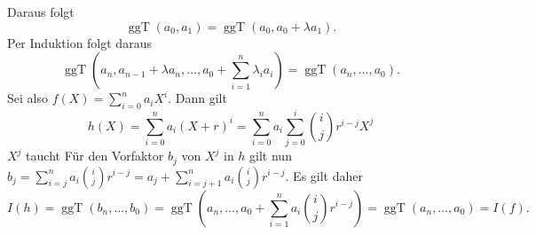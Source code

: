 \documentclass{article}
\newcommand{\ggT}{\operatorname{ggT}}
\begin{document}
\begin{enumerate}[(a)]
\[        \]
        Daraus folgt
        \[
            \ggT(a_0, a_1) = \ggT(a_0, a_0 + \lambda a_1).
        \]
        Per Induktion folgt daraus
        \[
            \ggT(a_n, a_{n-1} + \lambda a_n, \dots, a_0 + \sum_{i = 1}^{n} \lambda_i a_i) = \ggT(a_n, \dots, a_0). 
        \]
        Sei also $f(X) = \sum_{i = 0}^{n} a_i X^i$. Dann gilt 
        \[
            h(X) = \sum_{i = 0}^{n} a_i (X + r)^i = \sum_{i = 0}^{n} a_i \sum_{j = 0}^{i} \binom{i}{j} r^{i-j} X^j
        \]
        $X^j$ taucht 
        Für den Vorfaktor $b_j$ von $X^j$ in $h$ gilt nun $b_j = \sum_{i = j}^{n} a_i\binom{i}{j} r^{i-j} = a_j + \sum_{i = j+1}^{n} a_i \binom{i}{j} r^{i-j}$. Es gilt daher
        \[
            I(h) = \ggT(b_n, \dots, b_0) = \ggT\left(a_n, \dots, a_0 + \sum_{i = 1}^{n} a_i \binom{i}{j} r^{i-j}\right)  = \ggT(a_n, \dots, a_0) = I(f).
        \] 
    \end{enumerate}
\end{document}
